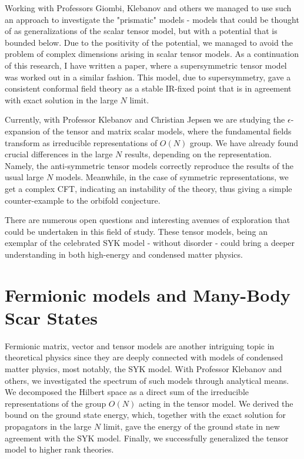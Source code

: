 \documentclass[11pt]{article}
\begin{document}
Working with Professors Giombi, Klebanov and others we managed to use such an approach to investigate the "prismatic" models - models that could be thought of as generalizations of the scalar tensor model, but with a potential that is bounded below. Due to the positivity of the potential, we managed to avoid the %
problem of complex dimensions arising in scalar tensor models. As a continuation of this research, I have written a paper, where a supersymmetric tensor model was worked out in a similar fashion. This model, due to supersymmetry, gave a consistent conformal field theory as a stable IR-fixed point that is in agreement with exact solution in the large $N$ limit.

Currently, with Professor Klebanov and Christian Jepsen %
we are studying the $\epsilon$-expansion of
the tensor and matrix scalar models, where the fundamental fields transform as irreducible representations of $O(N)$ group. We have already found crucial differences in the large $N$ results, depending on the representation.  Namely, the anti-symmetric tensor models correctly reproduce the results of the usual large $N$ models.  Meanwhile, in the case of symmetric representations, we get a complex CFT, indicating an instability of the theory, thus giving a simple counter-example to the orbifold conjecture. 


There are numerous open questions and interesting avenues of exploration that could be undertaken in this field of study. These tensor models, being an exemplar of the celebrated SYK model - without disorder - could bring a deeper understanding in both high-energy and condensed matter physics.

\section*{Fermionic models and Many-Body Scar States}
Fermionic matrix, vector and tensor models are another intriguing topic in theoretical physics since they are deeply connected with models of condensed matter physics, most notably, the SYK model. With Professor Klebanov and others, we investigated the spectrum of such models through analytical means. We decomposed the Hilbert space as a direct sum of the irreducible representations of the group $O(N)$ acting in the tensor model.
We derived the bound on the ground state energy, which, 
together with the exact solution for propagators in the large $N$ limit, gave the energy of the ground state in new agreement with the SYK model. Finally, we successfully generalized the tensor model to higher rank theories.
\end{document}
